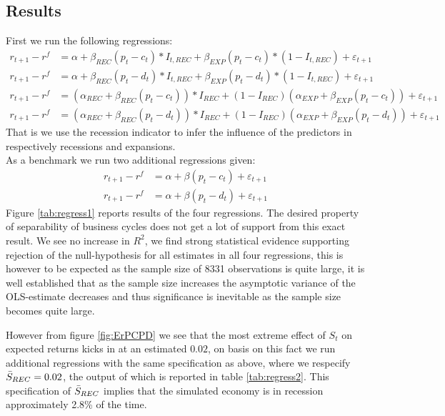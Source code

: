 \subsection{Results}
First we run the following regressions:
\begin{align*}
     r_{t+1} - r^{f} &= \alpha + \beta_{REC} \left( p_t - c_t \right) * I_{t,REC} + \beta_{EXP} \left( p_t - c_t \right) * \left(1 - I_{t,REC}\right)  + \varepsilon_{t+1}\\
      r_{t+1} - r^{f} &= \alpha + \beta_{REC} \left( p_t - d_t \right) * I_{t,REC} + \beta_{EXP} \left( p_t - d_t \right) * \left(1 - I_{t,REC}\right)  + \varepsilon_{t+1}\\
      r_{t+1} - r^{f} &= \left(\alpha_{REC} + \beta_{REC} \left(p_t - c_t\right)\right)*I_{REC} + \left(1-I_{REC}\right) \left( \alpha_{EXP} + \beta_{EXP}\left(p_t - c_t \right) \right) + \varepsilon_{t+1}\\
r_{t+1} - r^{f} &= \left(\alpha_{REC} + \beta_{REC} \left(p_t - d_t\right)\right)*I_{REC} + \left(1-I_{REC}\right) \left( \alpha_{EXP} + \beta_{EXP}\left(p_t - d_t \right) \right) + \varepsilon_{t+1}      
\end{align*}
That is we use the recession indicator to infer the influence of the predictors in respectively recessions and expansions.\\
As a benchmark we run two additional regressions given:
\begin{align*}
     r_{t+1} - r^{f} &= \alpha + \beta \left( p_t - c_t \right)  + \varepsilon_{t+1}\\
      r_{t+1} - r^{f} &= \alpha + \beta \left( p_t - d_t \right) + \varepsilon_{t+1}
\end{align*}
Figure \ref{tab:regress1} reports results of the four regressions. The desired property of separability of business cycles does not get a lot of support from this exact result. We see no increase in $R^2$, we find strong statistical evidence supporting rejection of the null-hypothesis for all estimates in all four regressions, this is however to be expected as the sample size of 8331 observations is quite large, it is well established that as the sample size increases the asymptotic variance of the OLS-estimate decreases and thus significance is inevitable as the sample size becomes quite large.


However from figure \ref{fig:ErPCPD} we see that the most extreme effect of $S_t$ on expected returns kicks in at an estimated $0.02$, on basis on this fact we run additional regressions with the same specification as above, where we respecify $\Bar{S}_{REC}=0.02$, the output of which is reported in table \ref{tab:regress2}. This specification of $\Bar{S}_{REC}$ implies that the simulated economy is in recession approximately 2.8\% of the time.

